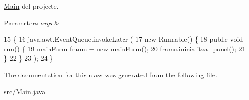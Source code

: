 \hyperlink{classMain}{Main} del projecte. 


\begin{DoxyParams}{Parameters}
{\em args} & \\
\hline
\end{DoxyParams}

\begin{DoxyCode}
15     \{
16         java.awt.EventQueue.invokeLater (
17                 \textcolor{keyword}{new} Runnable() \{
18                     \textcolor{keyword}{public} \textcolor{keywordtype}{void} run() \{
19                         \hyperlink{classpresentacion_1_1form_1_1mainForm}{mainForm} frame = \textcolor{keyword}{new} \hyperlink{classpresentacion_1_1form_1_1mainForm}{mainForm}();
20                         frame.\hyperlink{classpresentacion_1_1form_1_1mainForm_aae4c847b58c5d50945fa1dd27d534319}{inicialitza\_panel}();
21                     \}
22                 \}
23         );
24     \}
\end{DoxyCode}


The documentation for this class was generated from the following file\+:\begin{DoxyCompactItemize}
\item 
src/\hyperlink{Main_8java}{Main.\+java}\end{DoxyCompactItemize}
